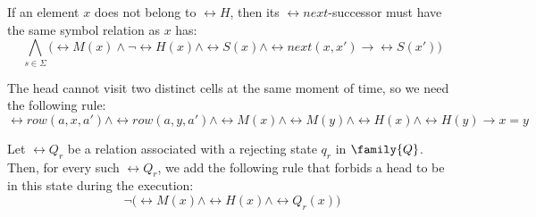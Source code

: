 \documentclass{lmcs}
\begin{document}
If an element $x$ does not belong to $\rel{H}$, then its $\rel{next}$-successor must have the same symbol relation as $x$ has:
\begin{equation}\label{eq:symbol_propagate}
\bigwedge_{s\in\Sigma}\bigl(\rel{M}(x)\wedge\neg\rel{H}(x)\wedge\rel{S}(x)\wedge\rel{next}(x,x')\to\rel{S}(x')\bigr)
\end{equation}

The head cannot visit two distinct cells at the same moment of  time, so we need the following rule:
\begin{equation}\label{eq:head_unique}
\rel{row}(a,x,a')\wedge\rel{row}(a,y,a')\wedge\rel{M}(x)\wedge\rel{M}(y)\wedge\rel{H}(x)\wedge\rel{H}(y)\to x=y
\end{equation}


Let $\rel{Q}_r$ be a relation associated with a rejecting state $q_r$ in $\family{Q}$. Then, for every such $\rel{Q}_r$, we add the following rule that forbids a head to be in this state during the execution:
\begin{equation}\label{eq:rejecting_state}
\neg\bigl(\rel{M}(x)\wedge\rel{H}(x)\wedge\rel{Q}_r(x)\bigr)
\end{equation}
\end{document}
